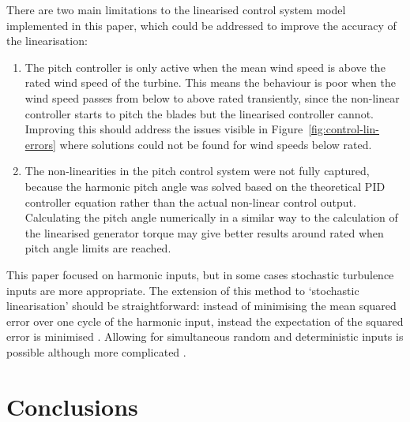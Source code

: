 \documentclass[preprint]{elsarticle}
\begin{document}
There are two main limitations to the linearised control system model
implemented in this paper, which could be addressed to improve the accuracy of
the linearisation:
\begin{enumerate}
\item The pitch controller is only active when the mean wind speed is above the
  rated wind speed of the turbine. This means the behaviour is poor when the
  wind speed passes from below to above rated transiently, since the non-linear
  controller starts to pitch the blades but the linearised controller cannot.
  Improving this should address the issues visible in
  Figure~\ref{fig:control-lin-errors} where solutions could not be found for
  wind speeds below rated.
\item The non-linearities in the pitch control system were not fully captured,
  because the harmonic pitch angle was solved based on the theoretical PID
  controller equation rather than the actual non-linear control output.
  Calculating the pitch angle numerically in a similar way to the calculation of
  the linearised generator torque may give better results around rated when
  pitch angle limits are reached.
\end{enumerate}

This paper focused on harmonic inputs, but in some cases stochastic turbulence
inputs are more appropriate. The extension of this method to `stochastic
linearisation' should be straightforward: instead of minimising the mean squared
error over one cycle of the harmonic input, instead the expectation of the
squared error is minimised \citep[see for example][chapter~6]{Roberts1990}.
Allowing for simultaneous random and deterministic inputs is possible although
more complicated \citep[chapter~7]{Roberts1990}.

\section{Conclusions}
\label{sec:control-conclusions}
\end{document}
